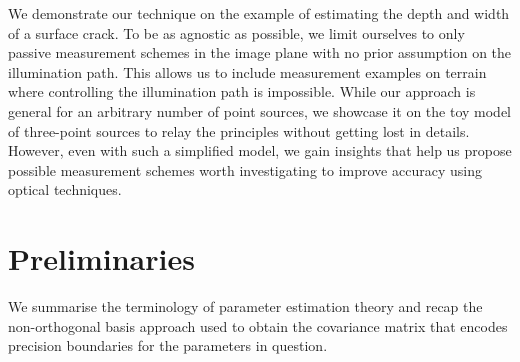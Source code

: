 \documentclass[reprint,amsmath,amssymb,aps,pra,floatfix]{revtex4-2}
\begin{document}
We demonstrate our technique on the example of estimating the depth and width of a surface crack. To be as agnostic as possible, we limit ourselves to only passive measurement schemes in the image plane with no prior assumption on the illumination path. This allows us to include measurement examples on terrain where controlling the illumination path is impossible. While our approach is general for an arbitrary number of point sources, we showcase it on the toy model of three-point sources to relay the principles without getting lost in details. However, even with such a simplified model, we gain insights that help us propose possible measurement schemes worth investigating to improve accuracy using optical techniques.


\section{\label{sec:prelim} Preliminaries}
We summarise the terminology of parameter estimation theory and recap the non-orthogonal basis approach used to obtain the covariance matrix that encodes precision boundaries for the parameters in question.
\end{document}
